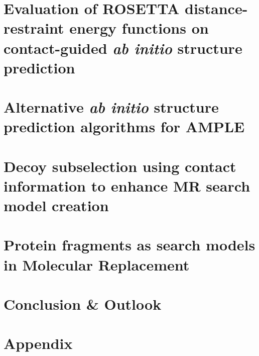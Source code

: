 \documentclass[11pt,twoside,reqno,openright]{report}
\begin{document}
\chapter{Evaluation of ROSETTA distance-restraint energy functions on contact-guided \textit{ab initio} structure prediction} \label{chap:rosetta_energy_functions}
\clearpage
% 

\chapter{Alternative \textit{ab initio} structure prediction algorithms for AMPLE} \label{chap:alternate_abinitio_protocols}
\clearpage
% 

\chapter{Decoy subselection using contact information to enhance MR search model creation} \label{chap:ample_decoys}
\clearpage
% 

\chapter{Protein fragments as search models in Molecular Replacement} \label{chap:ample_flib}
\clearpage
% 

\chapter{Conclusion \& Outlook}
\clearpage


\appendix
\chapter{Appendix}
\clearpage
% 

\printbibliography[heading=bibintoc]
\end{document}
